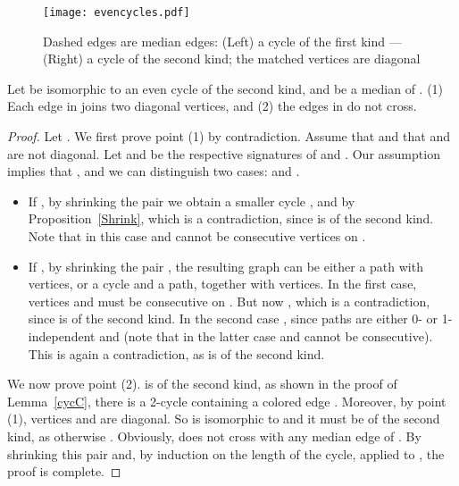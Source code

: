 \documentclass[10pt]{llncs}
\begin{document}
\begin{figure}{
  \begin{center}
    \texttt{[image: evencycles.pdf]}
  \caption{Dashed edges are median edges: (Left) a cycle  of the
    first kind --- (Right) a cycle  of the second kind; the
    matched vertices are diagonal}
       \label{cyckind}
  \end{center}
 }
\end{figure}




\begin{lemma} \label{2ndKind}
  Let  be isomorphic to an even cycle of the second kind, and 
  be a median of . (1) Each edge in  joins two diagonal
  vertices, and (2) the edges in  do not cross.
\end{lemma}

\begin{proof}
  Let .  We first prove point (1) by contradiction. Assume
  that  and that  and  are not diagonal. Let 
  and  be the respective signatures of  and . Our
  assumption implies that , and we can distinguish
  two cases:  and .
  \begin{itemize}
  \item If , by shrinking the pair  we
    obtain a smaller cycle , and by Proposition~\ref{Shrink},
     which
    is a contradiction, since  is of the second kind. Note that in
    this case  and  cannot be consecutive vertices on .
  \item If , by shrinking the pair , the
    resulting graph can be either a path with  vertices, or a
    cycle and a path, together with  vertices.  In the first
    case, vertices  and  must be consecutive on . But now
    , which is
    a contradiction, since  is of the second kind. In the second
    case , since paths are
    either 0- or 1-independent and  (note that in the
    latter case  and  cannot be consecutive). This is again a
    contradiction, as  is of the second kind.
  \end{itemize}

  We now prove point (2).  is of the second kind, as shown in the
  proof of Lemma~\ref{cycC}, there is a 2-cycle containing a colored
  edge . Moreover, by point (1), vertices  and  are
  diagonal. So  is isomorphic to  and it
  must be of the second kind, as otherwise . Obviously,  does not cross with any median edge of . By
  shrinking this pair and, by induction on the length of the cycle,
  applied to , the proof is complete. \end{proof}
\end{document}
